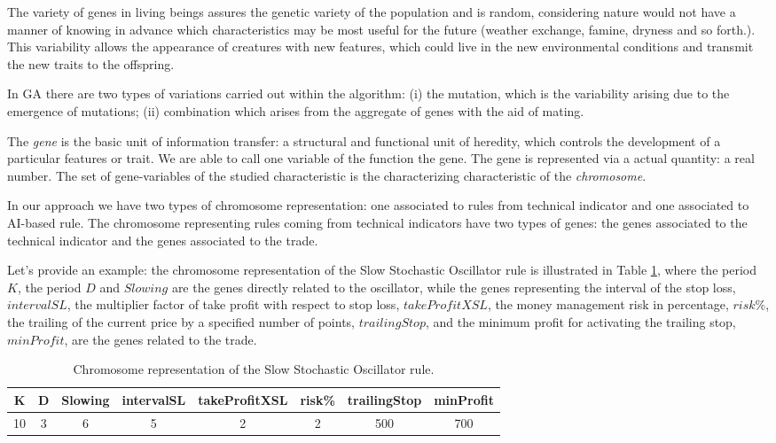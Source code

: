 The variety of genes in living beings assures the genetic variety of the population and is random, considering nature would not have a manner of knowing in advance which characteristics may be most useful for the future (weather exchange, famine, dryness and so forth.). This variability allows the appearance of creatures with new features, which could live in the new environmental conditions and transmit the new traits to the offspring.

In GA there are two types of variations carried out within the algorithm: (i) the mutation, which is the variability arising due to the emergence of mutations; (ii) combination which arises from the aggregate of genes with the aid of mating.

The \textit{gene} is the basic unit of information transfer: a structural and functional unit of heredity, which controls the development of a particular features or trait. We are able to call one variable of the function the gene. The gene is represented via a actual quantity: a real number. The set of gene-variables of the studied characteristic is the characterizing characteristic of the \textit{chromosome}.

In our approach we have two types of chromosome representation: one associated to rules from technical indicator and one associated to AI-based rule. 
The chromosome representing rules coming from technical indicators have two types of genes: the genes associated to the technical indicator and the genes associated to the trade.

Let's provide an example: the chromosome representation of the  Slow Stochastic Oscillator rule is illustrated in Table \ref{tab:Chromosome}, where the period $K$, the period $D$ and $Slowing$ are the genes directly related to the oscillator, while the genes representing the interval of the stop loss, $intervalSL$, the multiplier factor of take profit with respect to stop loss, $takeProfitXSL$, the money management risk in percentage, $risk\%$, the trailing of the current price by a specified number of points, $trailingStop$, and the minimum profit for activating the trailing stop, $minProfit$, are the genes related to the trade.

\begin{center}
\begin{table}[htb]
\centering
\begin{tabular}{|c|c|c|c|c|c|c|c|}
\hline 
K & D & Slowing & intervalSL & takeProfitXSL & risk\% & trailingStop & minProfit\\ 
\hline 
10 & 3 & 6 & 5 & 2 & 2 & 500 & 700\\ 
\hline 
\end{tabular} 
\caption{\label{tab:Chromosome}Chromosome representation of the  Slow Stochastic Oscillator rule.}
\end{table}
\end{center}

